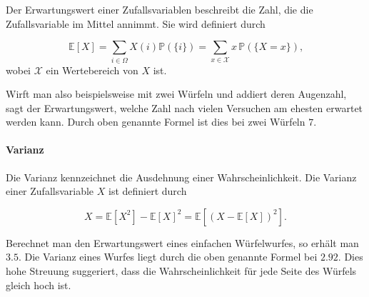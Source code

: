 \vspace{5pt}

 Der Erwartungswert einer Zufallsvariablen beschreibt die Zahl, die die Zufallsvariable im Mittel annimmt.
Sie wird definiert durch

\begin{equation*}
\mathbb{E} [X] = \sum_{i \in \Omega} X (i) \mathbb{P} (\{i\}) = \sum_{x\in\mathcal{X}} x \, \mathbb{P} (\{X=x\}) \text{,}
\end{equation*}
wobei $\mathcal{X}$ ein Wertebereich von $X$ ist.

Wirft man also beispielsweise mit zwei W\"urfeln und addiert deren Augenzahl, sagt der Erwartungswert, welche Zahl nach vielen Versuchen am ehesten erwartet werden kann. Durch oben genannte Formel ist dies bei zwei W\"urfeln $7$.

\vspace{10pt}

\paragraph {Varianz}

\vspace{5pt}

Die Varianz kennzeichnet die Ausdehnung einer Wahrscheinlichkeit. Die Varianz einer Zufallsvariable $X$ ist definiert durch


\begin{equation*}
X= \mathbb{E} [X^2] - \mathbb{E} [X]^2 = \mathbb{E} [ (X - \mathbb{E} [X] )^2 ].
\end{equation*}

Berechnet man den Erwartungswert eines einfachen W\"urfelwurfes, so erh\"alt man $3.5$. Die Varianz eines Wurfes liegt durch die oben genannte Formel bei $2.92$. Dies hohe Streuung suggeriert, dass die Wahrscheinlichkeit f\"ur jede Seite des W\"urfels gleich hoch ist.

\vspace{10pt}

